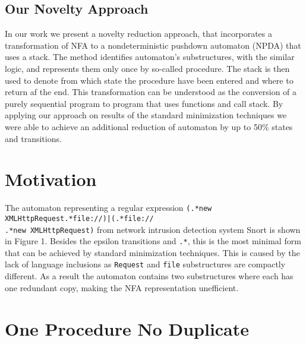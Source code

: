 \documentclass{ExcelAtFIT}
\begin{document}
	\subsection*{Our Novelty Approach}
		In our work we present a novelty reduction approach, that incorporates a transformation of NFA to a nondeterministic pushdown automaton (NPDA) that uses a stack. The method identifies automaton's substructures, with the similar logic, and represents them only once by so-called procedure. The stack is then used to denote from which state the procedure have been entered and where to return af the end. This transformation can be understood as the conversion of a purely sequential program to program that uses functions and call stack. By applying our approach on results of the standard minimization techniques we were able to achieve an additional reduction of automaton by up to 50\% states and transitions.

\section{Motivation}
	The automaton representing a regular expression \texttt{(.*new XMLHttpRequest.*file://)|(.*file://\\.*new XMLHttpRequest)} from network intrusion detection system Snort \cite{Snort} is shown in Figure 1. Besides the epsilon transitions and \texttt{.*}, this is the most minimal form that can be achieved by standard minimization techniques. This is caused by the lack of language inclusions as  \texttt{Request} and \texttt{file} substructures are compactly different. As a result the automaton contains two substructures where each has one redundant copy, making the NFA representation unefficient.

\section{One Procedure No Duplicate}



\end{document}

